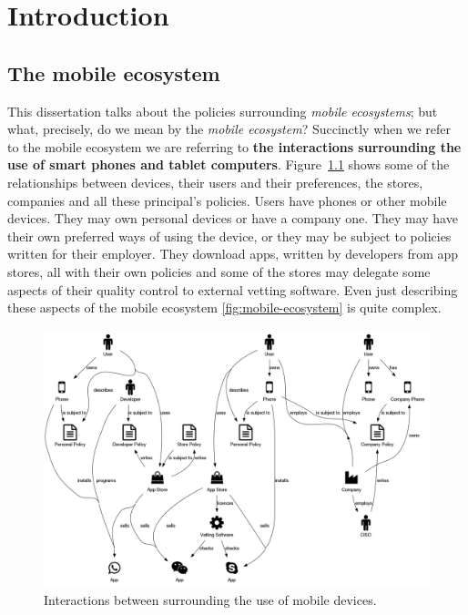\documentclass[thesis.tex]{subfiles}
\begin{document}
\chapter{Introduction}


\section{The mobile ecosystem}\label{sec:mobile-ecosystem}

This dissertation talks about the policies surrounding \emph{mobile
ecosystems}; but what, precisely, do we mean by the \emph{mobile
ecosystem}?  Succinctly when we refer to the mobile ecosystem we are
referring to \textbf{the interactions surrounding the use of smart
phones and tablet computers}.  Figure~\ref{fig:mobile-ecosystem} shows
some of the relationships between devices, their users and their
preferences, the stores, companies and all these principal's
policies. Users have phones or other mobile devices.  They may own
personal devices or have a company one.  They may have their own
preferred ways of using the device, or they may be subject to policies
written for their employer.  They download apps, written by developers
from app stores, all with their own policies and some of the stores
may delegate some aspects of their quality control to external vetting
software.  Even just describing these aspects of the mobile ecosystem
\autoref{fig:mobile-ecosystem} is quite complex.

\begin{figure}
  \centering
  \includegraphics[width=\linewidth]{figures/mobile-ecosystem.png}
  \caption{Interactions between surrounding the use of mobile devices.}
  \label{fig:mobile-ecosystem}
\end{figure}
\end{document}
